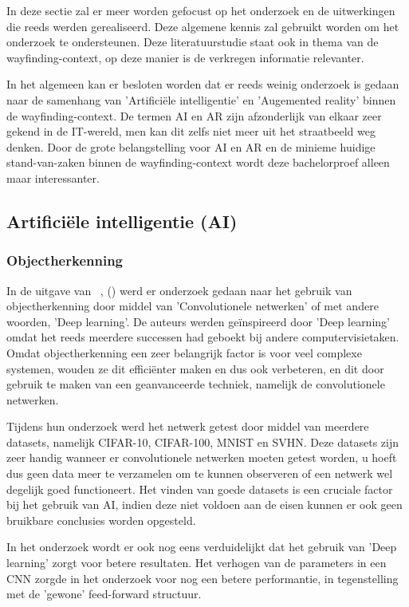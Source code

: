In deze sectie zal er meer worden gefocust op het onderzoek en de uitwerkingen die reeds werden gerealiseerd. Deze algemene kennis zal gebruikt worden om het onderzoek te ondersteunen. Deze literatuurstudie staat ook in thema van de wayfinding-context, op deze manier is de verkregen informatie relevanter.

In het algemeen kan er besloten worden dat er reeds weinig onderzoek is gedaan naar de samenhang van 'Artificiële intelligentie' en 'Augemented reality' binnen de wayfinding-context. De termen AI en AR zijn afzonderlijk van elkaar zeer gekend in de IT-wereld, men kan dit zelfs niet meer uit het straatbeeld weg denken. Door de grote belangstelling voor AI en AR en de minieme huidige stand-van-zaken binnen de wayfinding-context wordt deze bachelorproef alleen maar interessanter.

\subsection{Artificiële intelligentie (AI)}

\subsubsection{Objectherkenning}
In de uitgave van ~\textcite{Liang2015}, () werd er onderzoek gedaan naar het gebruik van objectherkenning door middel van 'Convolutionele netwerken' of met andere woorden, 'Deep learning'. De auteurs werden geïnspireerd door 'Deep learning' omdat het reeds meerdere successen had geboekt bij andere computervisietaken. Omdat objectherkenning een zeer belangrijk factor is voor veel complexe systemen, wouden ze dit efficiënter maken en dus ook verbeteren, en dit door gebruik te maken van een geanvanceerde techniek, namelijk de convolutionele netwerken. 

Tijdens hun onderzoek werd het netwerk getest door middel van meerdere datasets, namelijk CIFAR-10, CIFAR-100, MNIST en SVHN. Deze datasets zijn zeer handig wanneer er convolutionele netwerken moeten getest worden, u hoeft dus geen data meer te verzamelen om te kunnen observeren of een netwerk wel degelijk goed functioneert. Het vinden van goede datasets is een cruciale factor bij het gebruik van AI, indien deze niet voldoen aan de eisen kunnen er ook geen bruikbare conclusies worden opgesteld.

In het onderzoek wordt er ook nog eens verduidelijkt dat het gebruik van 'Deep learning' zorgt voor betere resultaten. Het verhogen van de parameters in een CNN zorgde in het onderzoek voor nog een betere performantie, in tegenstelling met de 'gewone' feed-forward structuur. 

